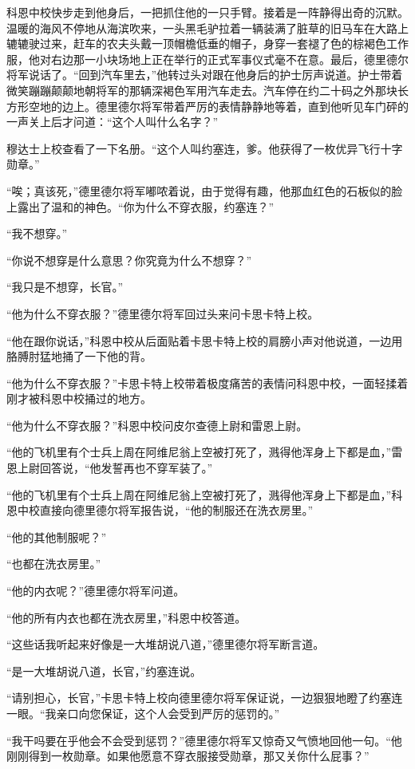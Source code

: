     科恩中校快步走到他身后，一把抓住他的一只手臂。接着是一阵静得出奇的沉默。温暖的海风不停地从海滨吹来，一头黑毛驴拉着一辆装满了脏草的旧马车在大路上辘辘驶过来，赶车的农夫头戴一顶帽檐低垂的帽子，身穿一套褪了色的棕褐色工作服，他对右边那一小块场地上正在举行的正式军事仪式毫不在意。最后，德里德尔将军说话了。“回到汽车里去，”他转过头对跟在他身后的护士厉声说道。护士带着微笑蹦蹦颠颠地朝将军的那辆深褐色军用汽车走去。汽车停在约二十码之外那块长方形空地的边上。德里德尔将军带着严厉的表情静静地等着，直到他听见车门砰的一声关上后才问道：“这个人叫什么名字？”

    穆达士上校查看了一下名册。“这个人叫约塞连，爹。他获得了一枚优异飞行十字勋章。”

    “唉；真该死，”德里德尔将军嘟哝着说，由于觉得有趣，他那血红色的石板似的脸上露出了温和的神色。“你为什么不穿衣服，约塞连？”

    “我不想穿。”

    “你说不想穿是什么意思？你究竟为什么不想穿？”

    “我只是不想穿，长官。”

    “他为什么不穿衣服？”德里德尔将军回过头来问卡思卡特上校。

    “他在跟你说话，”科恩中校从后面贴着卡思卡特上校的肩膀小声对他说道，一边用胳膊肘猛地捅了一下他的背。

    “他为什么不穿衣服？”卡思卡特上校带着极度痛苦的表情问科恩中校，一面轻揉着刚才被科恩中校捅过的地方。

    “他为什么不穿衣服？”科恩中校问皮尔查德上尉和雷恩上尉。

    “他的飞机里有个士兵上周在阿维尼翁上空被打死了，溅得他浑身上下都是血，”雷恩上尉回答说，“他发誓再也不穿军装了。”

    “他的飞机里有个士兵上周在阿维尼翁上空被打死了，溅得他浑身上下都是血，”科恩中校直接向德里德尔将军报告说，“他的制服还在洗衣房里。”

    “他的其他制服呢？”

    “也都在洗衣房里。”

    “他的内衣呢？”德里德尔将军问道。

    “他的所有内衣也都在洗衣房里，”科恩中校答道。

    “这些话我听起来好像是一大堆胡说八道，”德里德尔将军断言道。

    “是一大堆胡说八道，长官，”约塞连说。

    “请别担心，长官，”卡思卡特上校向德里德尔将军保证说，一边狠狠地瞪了约塞连一眼。“我亲口向您保证，这个人会受到严厉的惩罚的。”

    “我干吗要在乎他会不会受到惩罚？”德里德尔将军又惊奇又气愤地回他一句。“他刚刚得到一枚勋章。如果他愿意不穿衣服接受勋章，那又关你什么屁事？”

